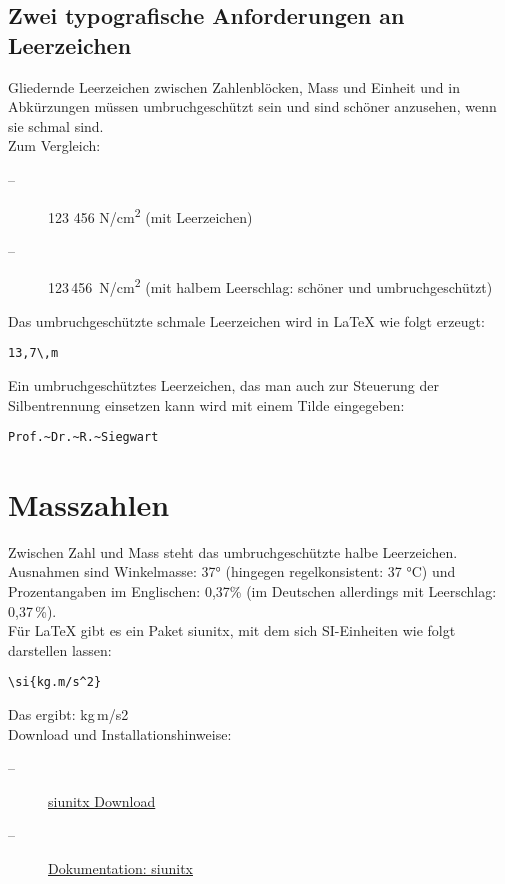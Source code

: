 \subsection{Zwei typografische Anforderungen an Leerzeichen}

Gliedernde Leerzeichen zwischen Zahlenblöcken, Mass und Einheit und in
Abkürzungen müssen umbruchgeschützt sein und sind schöner anzusehen, wenn
sie schmal sind. \\

Zum Vergleich:
\begin{description}
  \item[--] 123 456 N/cm\textsuperscript{2} (mit Leerzeichen)
  \item[--] 123\,456 N/cm\textsuperscript{2} (mit halbem Leerschlag: 
  schöner und umbruchgeschützt)
\end{description}

Das umbruchgeschützte schmale Leerzeichen wird in LaTeX wie folgt erzeugt: 
\begin{verbatim}13,7\,m\end{verbatim}

Ein umbruchgeschütztes Leerzeichen, das man auch zur Steuerung der Silbentrennung
einsetzen kann wird mit einem Tilde eingegeben:
\begin{verbatim}Prof.~Dr.~R.~Siegwart\end{verbatim}

\section{Masszahlen}

Zwischen Zahl und Mass steht das umbruchgeschützte halbe Leerzeichen. Ausnahmen 
sind Winkelmasse: 37° (hingegen regelkonsistent: 37 °C) und Prozentangaben im 
Englischen: 0,37\% (im Deutschen allerdings mit Leerschlag: 0,37\,\%). \\

Für LaTeX gibt es ein Paket siunitx, mit dem sich SI-Einheiten wie folgt 
darstellen lassen:
\begin{verbatim}
\si{kg.m/s^2} 
\end{verbatim}

Das ergibt: kg\,m/s2 \\

Download und Installationshinweise:
\begin{description}
\item[--] \href{https://ctan.org/pkg/siunitx?lang=de}{siunitx Download}
\item[--] \href{https://mirror.kumi.systems/ctan/macros/latex/contrib/siunitx/siunitx.pdf}{Dokumentation: siunitx}
\end{description}

